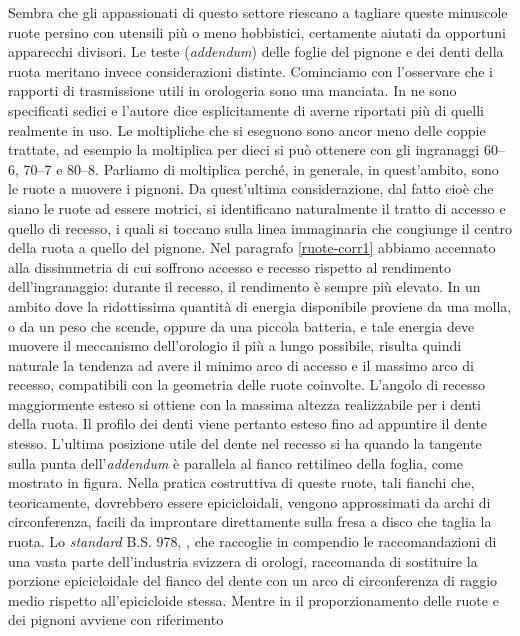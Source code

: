 Sembra che gli appassionati di questo settore riescano a tagliare queste
minuscole ruote persino con utensili pi\`u o meno hobbistici,
 certamente aiutati
da opportuni apparecchi divisori. Le teste ({\em addendum}) delle foglie
del  pignone e dei denti della ruota meritano invece considerazioni
distinte. Cominciamo con l'osservare che i rapporti di trasmissione
utili in orologeria sono una manciata. In \cite{grossmann} ne sono
specificati sedici e l'autore dice esplicitamente di averne riportati
pi\`u di quelli realmente in uso. Le moltipliche che si eseguono
sono ancor meno delle coppie trattate, ad esempio la moltiplica per
dieci si pu\`o ottenere con gli ingranaggi
 60--6, 70--7 e 80--8. Parliamo di moltiplica
perch\'e, in generale, in quest'ambito, sono le ruote a muovere i pignoni. 
Da quest'ultima considerazione, dal fatto cio\`e che siano
le ruote ad essere motrici, si identificano naturalmente il
tratto di accesso e quello di recesso, i quali si toccano sulla
linea immaginaria che congiunge il centro della ruota a quello del
pignone.
Nel paragrafo \ref{ruote-corr1} abbiamo accennato alla dissimmetria
di cui soffrono accesso e recesso rispetto al rendimento dell'ingranaggio:
durante il recesso, il rendimento \`e sempre pi\`u elevato.
In un ambito dove la ridottissima quantit\`a di energia disponibile proviene da
una molla, o da un peso che scende, oppure da una piccola batteria, e
tale energia deve muovere il meccanismo dell'orologio il pi\`u a lungo
possibile, risulta quindi naturale 
la tendenza ad avere il minimo arco di accesso e il massimo
arco di recesso, compatibili con la geometria delle ruote coinvolte.
L'angolo di recesso maggiormente esteso
si ottiene con la massima altezza realizzabile per i denti della ruota.
Il profilo dei denti viene pertanto esteso fino ad appuntire il dente
stesso. L'ultima posizione utile del dente nel recesso si ha quando la
tangente sulla punta dell'{\em addendum} \`e parallela al fianco rettilineo della
foglia, come mostrato in figura.
Nella pratica costruttiva di queste ruote, tali fianchi che,
teoricamente, dovrebbero essere epicicloidali,
 vengono approssimati da archi di circonferenza,
facili da improntare direttamente sulla fresa a disco che taglia la
ruota.  Lo {\em standard}
 B.S. 978, \cite{bs978}, che raccoglie in compendio le raccomandazioni
di una vasta parte dell'industria svizzera di orologi, raccomanda di sostituire
la porzione epicicloidale del fianco del dente con un arco di circonferenza di
raggio medio rispetto all'epicicloide stessa. Mentre in \cite{grossmann}
il proporzionamento delle ruote e dei pignoni avviene con riferimento
